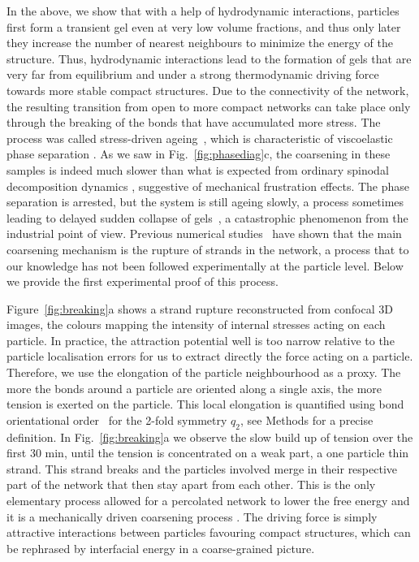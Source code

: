 \documentclass[preprint,footinbib,amsmath,amssymb,superscriptaddress]{revtex4}
\begin{document}
In the above, we show that with a help of hydrodynamic interactions, particles first form
a transient gel even at very low volume fractions, and thus only later they increase the number of
nearest neighbours to minimize the energy of the structure. 
Thus, hydrodynamic interactions lead to the formation of gels that are very far from equilibrium and under a strong thermodynamic driving force 
towards more stable compact structures. 
Due to the connectivity of the network, the resulting transition from open to more compact networks can take place only through
the breaking of the bonds that have accumulated more stress. The process was called stress-driven ageing~\cite{Tanaka2007}, 
which is characteristic of viscoelastic phase separation \cite{tanaka2000viscoelastic}. 
As we saw in Fig.~\ref{fig:phasediag}c, the coarsening in these samples is indeed much slower than what is expected from ordinary spinodal decomposition dynamics \cite{onuki2002phase}, 
suggestive of mechanical frustration effects. The phase separation is arrested, but the system is still ageing slowly, a process sometimes leading to delayed sudden collapse of gels~\cite{poon1999delayed,Bartlett2012}, a catastrophic phenomenon from the industrial point of view. Previous numerical studies~\cite{Tanaka2007,colombo2014self,testard2014intermittent} have shown that the main coarsening mechanism is the rupture of strands in the network, a process that to our knowledge has not been followed experimentally at the particle level.
Below we provide the first experimental proof of this process. 

Figure~\ref{fig:breaking}a shows a strand rupture reconstructed from confocal 3D images, the colours mapping the intensity of internal stresses acting on each particle. In practice, the attraction potential well is too narrow relative to the particle localisation errors for us to extract directly the force acting on a particle. Therefore, we use the elongation of the particle neighbourhood as a proxy. The more the bonds around a particle are oriented along a single axis, the more tension is exerted on the particle. This local elongation is quantified using bond orientational order~\cite{steinhardt1983boo} for the 2-fold symmetry $q_2$, see Methods for a precise definition. In Fig.~\ref{fig:breaking}a we observe the slow build up of tension over the first 30 min, until the tension is concentrated on a weak part, a one particle thin strand. This strand breaks and the particles involved merge in their respective part of the network that then stay apart from each other. This is the only elementary process allowed for a percolated network to lower the free energy and it is a mechanically driven coarsening process \cite{Tanaka2007}. The driving force is simply attractive interactions between particles favouring compact structures, which can be rephrased by 
interfacial energy in a coarse-grained picture. 
\end{document}
